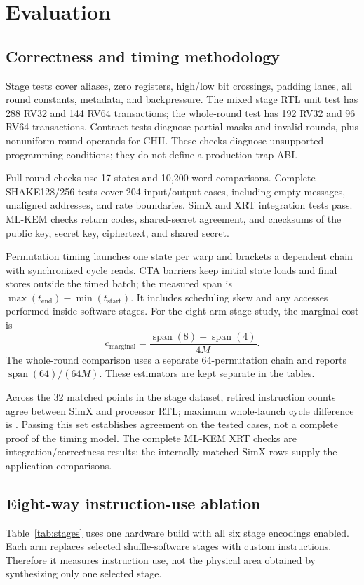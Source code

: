 \documentclass[conference,letterpaper]{IEEEtran}
\begin{document}
\section{Evaluation}
\subsection{Correctness and timing methodology}
Stage tests cover aliases, zero registers, high/low bit crossings, padding
lanes, all round constants, metadata, and backpressure. The mixed stage
RTL unit test has 288 RV32 and 144 RV64 transactions; the whole-round test
has 192 RV32 and 96 RV64 transactions.
Contract tests diagnose partial masks and invalid rounds, plus nonuniform
round operands for CHII. These checks diagnose unsupported programming
conditions; they do not define a production trap ABI.

Full-round checks use 17 states and 10,200 word comparisons. Complete
SHAKE128/256 tests cover 204 input/output cases, including empty messages,
unaligned addresses, and rate boundaries. SimX and XRT integration tests
pass. ML-KEM checks return codes, shared-secret agreement, and checksums
of the public key, secret key, ciphertext, and shared secret.

Permutation timing launches one state per warp and brackets a dependent
chain with synchronized cycle reads. CTA barriers keep initial state loads
and final stores outside the timed batch; the measured span is
$\max(t_{\mathrm{end}})-\min(t_{\mathrm{start}})$.
It includes scheduling skew and any accesses performed inside software
stages. For the eight-arm stage study, the marginal cost is
\begin{equation}
c_{\mathrm{marginal}}=
\frac{\operatorname{span}(8)-\operatorname{span}(4)}{4M}.
\label{eq:marginal}
\end{equation}
The whole-round comparison uses a separate 64-permutation chain and
reports $\operatorname{span}(64)/(64M)$. These estimators are kept
separate in the tables.

Across the 32 matched points in the stage dataset, retired instruction
counts agree between SimX and processor RTL; maximum whole-launch cycle
difference is \StageMaxModelGap{}. Passing this set establishes agreement
on the tested cases, not a complete proof of the timing model.
The complete ML-KEM XRT checks are integration/correctness results;
the internally matched SimX rows supply the application comparisons.

\subsection{Eight-way instruction-use ablation}
Table~\ref{tab:stages} uses one hardware build with all six stage encodings
enabled. Each arm replaces selected shuffle-software stages with custom
instructions. Therefore it measures instruction use, not the physical
area obtained by synthesizing only one selected stage.
\end{document}
